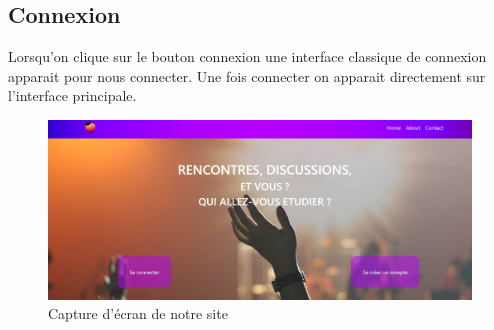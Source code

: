 \documentclass[12pt]{report}
\begin{document}
\subsection{Connexion}
	Lorsqu'on clique sur le bouton connexion une interface classique de connexion apparait pour nous connecter. Une fois connecter on apparait directement sur l'interface principale.
\begin{figure}[h!]
	\begin{center}
		\includegraphics[scale=0.5]{acceuil.jpg}
	\end{center}
		\caption{Capture d'écran de notre site}
\end{figure}
\clearpage
\end{document}
